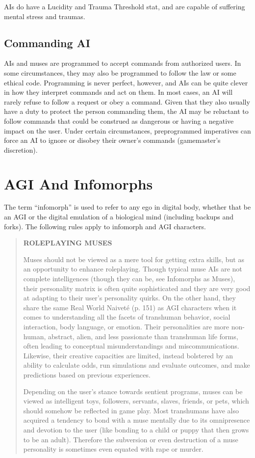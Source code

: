 AIs do have a Lucidity and Trauma Threshold stat, 
and are capable of suffering mental stress and traumas.

\subsection{Commanding AI}

AIs and muses are programmed to accept commands 
from authorized users. In some circumstances, they 
may also be programmed to follow the law or some 
ethical code. Programming is never perfect, however, 
and AIs can be quite clever in how they interpret 
commands and act on them. In most cases, an AI will 
rarely refuse to follow a request or obey a command. 
Given that they also usually have a duty to protect the 
person commanding them, the AI may be reluctant to 
follow commands that could be construed as dangerous
or having a negative impact on the user. Under
certain circumstances, preprogrammed imperatives 
can force an AI to ignore or disobey their owner's 
commands (gamemaster's discretion).

\section{AGI And Infomorphs}

The term ``infomorph'' is used to refer to any ego in 
digital body, whether that be an AGI or the digital 
emulation of a biological mind (including backups 
and forks). The following rules apply to infomorph 
and AGI characters.

\begin{quotation}
\textbf{ROLEPLAYING MUSES}

Muses should not be viewed as a mere tool for
getting extra skills, but as an opportunity to
enhance roleplaying. Though typical muse AIs
are not complete intelligences (though they can
be, see Infomorphs as Muses), their personality
matrix is often quite sophisticated and they are
very good at adapting to their user’s personality
quirks. On the other hand, they share the same
Real World Naiveté (p. 151) as AGI characters
when it comes to understanding all the facets
of transhuman behavior, social interaction,
body language, or emotion. Their personalities
are more non-human, abstract, alien, and less
passionate than transhuman life forms, often
leading to conceptual misunderstandings and
miscommunications. Likewise, their creative
capacities are limited, instead bolstered by an
ability to calculate odds, run simulations and
evaluate outcomes, and make predictions based
on previous experiences.

Depending on the user’s stance towards sentient
programs, muses can be viewed as intelligent
toys, followers, servants, slaves, friends,
or pets, which should somehow be reflected in
game play. Most transhumans have also acquired
a tendency to bond with a muse mentally due to
its omnipresence and devotion to the user (like
bonding to a child or puppy that then grows to
be an adult). Therefore the subversion or even
destruction of a muse personality is sometimes
even equated with rape or murder.
\end{quotation}


